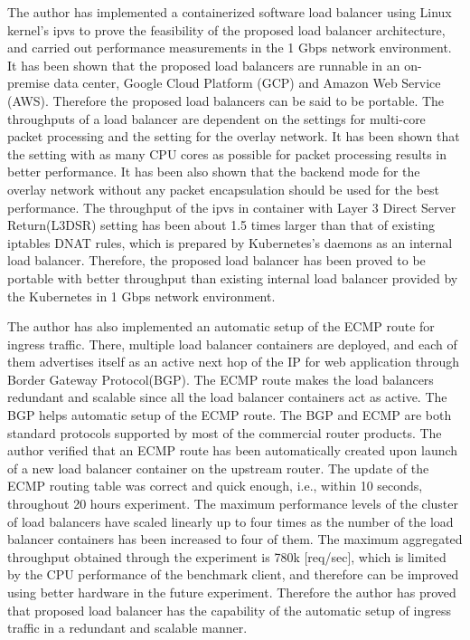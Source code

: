 The author has implemented a containerized software load balancer using Linux kernel's ipvs to prove the feasibility of the proposed load balancer architecture, and carried out performance measurements in the 1 Gbps network environment.
It has been shown that the proposed load balancers are runnable in an on-premise data center, Google Cloud Platform (GCP) and Amazon Web Service (AWS).
Therefore the proposed load balancers can be said to be portable.
%
The throughputs of a load balancer are dependent on the settings for multi-core packet processing and the setting for the overlay network.
It has been shown that the setting with as many CPU cores as possible for packet processing results in better performance.
It has been also shown that the backend mode for the overlay network without any packet encapsulation should be used for the best performance.
%
The throughput of the ipvs in container with Layer 3 Direct Server Return(L3DSR) setting has been about 1.5 times larger than that of existing iptables DNAT rules, which is prepared by Kubernetes's daemons as an  internal load balancer.
Therefore, the proposed load balancer has been proved to be portable with better throughput than existing internal load balancer provided by the Kubernetes in 1 Gbps network environment.

The author has also implemented an automatic setup of the ECMP route for ingress traffic.
There, multiple load balancer containers are deployed, and each of them advertises itself as an active next hop of the IP for web application through Border Gateway Protocol(BGP).
The ECMP route makes the load balancers redundant and scalable since all the load balancer containers act as active.
The BGP helps automatic setup of the ECMP route.  
The BGP and ECMP are both standard protocols supported by most of the commercial router products.
%
The author verified that an ECMP route has been automatically created upon launch of a new load balancer container on the upstream router.
The update of the ECMP routing table was correct and quick enough, i.e., within 10 seconds, throughout 20 hours experiment.
The maximum performance levels of the cluster of load balancers have scaled linearly up to four times as the number of the load balancer containers has been increased to four of them.
The maximum aggregated throughput obtained through the experiment is 780k [req/sec], which is limited by the CPU performance of the benchmark client, and therefore can be improved using better hardware in the future experiment.
Therefore the author has proved that proposed load balancer has the capability of the automatic setup of ingress traffic in a redundant and scalable manner.


